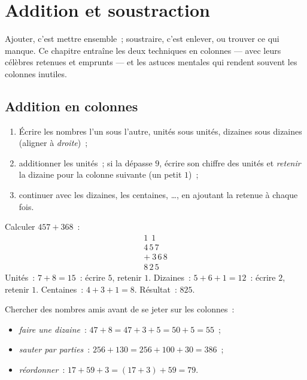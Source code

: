 \chapter{Addition et soustraction}\label{ch:g3:addsub}

Ajouter, c'est mettre ensemble~; soustraire, c'est enlever, ou
trouver ce qui manque. Ce chapitre entraîne les deux techniques en
colonnes --- avec leurs célèbres retenues et emprunts --- et les
astuces mentales qui rendent souvent les colonnes inutiles.

\section{Addition en colonnes}

\begin{method}\label{met:g3:addsub:add}
\begin{enumerate}
  \item Écrire les nombres l'un sous l'autre, unités sous unités,
        dizaines sous dizaines (aligner à \emph{droite})~;
  \item additionner les unités~; si la  dépasse $9$, écrire
        son chiffre des unités et \emph{retenir} la dizaine pour la
        colonne suivante (un petit $1$)~;
  \item continuer avec les dizaines, les centaines, \dots, en
        ajoutant la retenue à chaque fois.
\end{enumerate}
\end{method}

\begin{example}\label{ex:g3:addsub:add}
Calculer $457 + 368$~:
\[
\begin{array}{r}
{\scriptstyle 1}\ \ {\scriptstyle 1}\ \ \phantom{0} \\[-3pt]
4\,5\,7 \\
+\ 3\,6\,8 \\
\hline
8\,2\,5
\end{array}
\]
Unités~: $7 + 8 = 15$~: écrire $5$, retenir $1$. Dizaines~:
$5 + 6 + 1 = 12$~: écrire $2$, retenir $1$. Centaines~:
$4 + 3 + 1 = 8$. Résultat~: $825$.
\end{example}

\begin{example}\label{ex:g3:addsub:mental}
Chercher des nombres amis avant de se jeter sur les colonnes~:
\begin{itemize}
  \item \emph{faire une dizaine}~: $47 + 8 = 47 + 3 + 5 = 50 + 5 =
        55$~;
  \item \emph{sauter par parties}~: $256 + 130 = 256 + 100 + 30 =
        386$~;
  \item \emph{réordonner}~: $17 + 59 + 3 = (17 + 3) + 59 = 79$.
\end{itemize}
\end{example}

